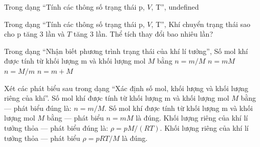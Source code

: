 \begin{bt}
Trong dạng “Tính các thông số trạng thái p, $V$, T”, undefined
\end{bt}

\begin{ex}
Trong dạng “Tính các thông số trạng thái p, $V$, T”, Khí chuyển trạng thái sao cho p tăng 3 lần và $T$ tăng 3 lần. Thể tích thay đổi bao nhiêu lần?
\end{ex}

\begin{ex}
Trong dạng “Nhận biết phương trình trạng thái của khí lí tưởng”, Số mol khí được tính từ khối lượng m và khối lượng mol $M$ bằng
\choice
{\True $n=m/M$}
{$n=mM$}
{$n=M/m$}
{$n=m+M$}
\end{ex}

\begin{ex}
Xét các phát biểu sau trong dạng “Xác định số mol, khối lượng và khối lượng riêng của khí”.
\choiceTF
{\True Số mol khí được tính từ khối lượng m và khối lượng mol $M$ bằng — phát biểu đúng là: $n=m/M$.}
{Số mol khí được tính từ khối lượng m và khối lượng mol $M$ bằng — phát biểu $n=mM$ là đúng.}
{\True Khối lượng riêng của khí lí tưởng thỏa — phát biểu đúng là: $\rho=pM/(RT)$.}
{Khối lượng riêng của khí lí tưởng thỏa — phát biểu $\rho=pRT/M$ là đúng.}
\end{ex}


